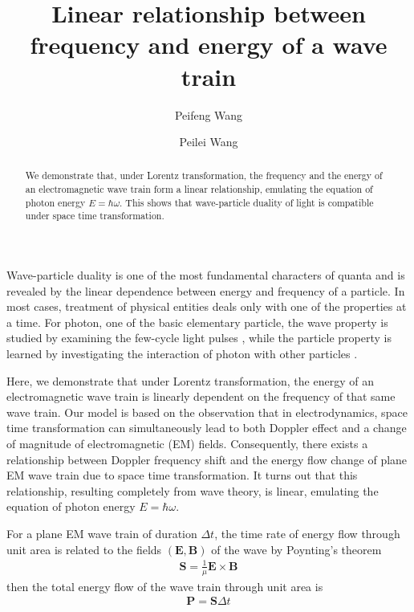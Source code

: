 \documentclass[prd,showpacs,twocolumn]{revtex4-1}
\begin{document}
\title{Linear relationship between frequency and energy of a wave train}
\author{Peifeng Wang}
\author{Peilei Wang}
\address{Guanghua Road 1\#, 34-1-3-5, Yanta District, Xi'an, Shaanxi, P. R. China 710075}
\address{Mijiaqiao 34-1-3-5, Xi'an, Shaanxi, P. R. China 710075}
\begin{abstract}
We demonstrate that, under Lorentz transformation, the frequency and the energy of an electromagnetic wave train form a linear relationship, emulating the equation of photon energy $E=\hbar\omega$. This shows that wave-particle duality of light is compatible under space time transformation.
\end{abstract}
\maketitle

Wave-particle duality is one of the most fundamental characters of quanta and is revealed by the linear dependence between energy and frequency of a particle. In most cases, treatment of physical entities deals only with one of the properties at a time. For photon, one of the basic elementary particle, the wave property is studied by examining the few-cycle light pulses \cite{Salieres, Jones, Hentschel, Nisoli, Paulus}, while the particle property is learned by investigating the interaction of photon with other particles \cite{Gluck, Donnachie, Belitsky, Baba, Fiore}.

Here, we demonstrate that under Lorentz transformation, the energy of an electromagnetic wave train is linearly dependent on the frequency of that same wave train. Our model is based on the observation that in electrodynamics, space time transformation can simultaneously lead to both Doppler effect and a change of magnitude of electromagnetic (EM) fields. Consequently, there exists a relationship between Doppler frequency shift and the energy flow change of plane EM wave train due to space time transformation. It turns out that this relationship, resulting completely from wave theory, is linear, emulating the equation of photon energy $E=\hbar\omega$.

For a plane EM wave train of duration $\Delta t$, the time rate of energy flow through unit area is related to the fields $(\mathbf{E}, \mathbf{B})$ of the wave by Poynting's theorem
\begin{eqnarray}
\mathbf{S}=\frac{1}{\mu}\mathbf{E}\times\mathbf{B}
\end{eqnarray}
then the total energy flow of the wave train through unit area is
\begin{eqnarray}
\mathbf{P}=\mathbf{S}\Delta t
\end{eqnarray}
\end{document}
